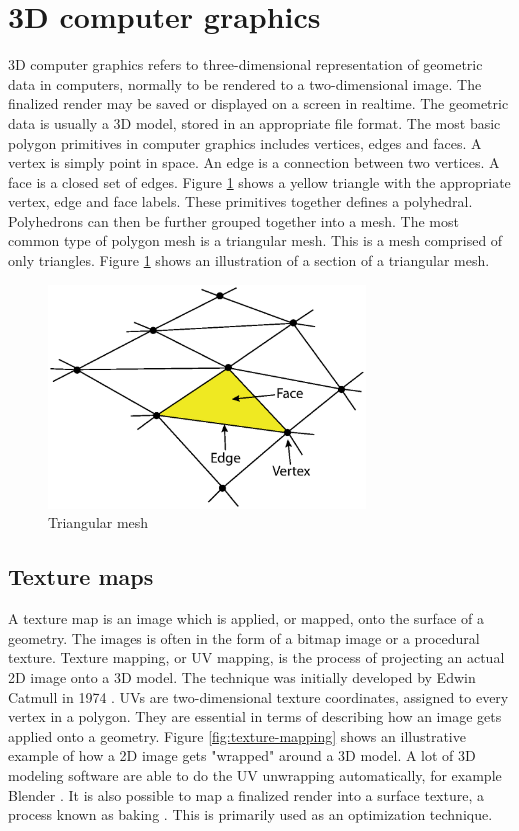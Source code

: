 \section{3D computer graphics}
3D computer graphics refers to three-dimensional representation of geometric data in computers, normally to be rendered to a two-dimensional image. The finalized render may be saved or displayed on a screen in realtime. The geometric data is usually a 3D model, stored in an appropriate file format. The most basic polygon primitives in computer graphics includes vertices, edges and faces. A vertex is simply point in space. An edge is a connection between two vertices. A face is a closed set of edges. Figure \ref{fig:triangular-mesh} shows a yellow triangle with the appropriate vertex, edge and face labels. These primitives together defines a polyhedral. Polyhedrons can then be further grouped together into a mesh. The most common type of polygon mesh is a triangular mesh. This is a mesh comprised of only triangles. Figure \ref{fig:triangular-mesh} shows an illustration of a section of a triangular mesh.
\begin{figure}[h]
    \centering
    \includegraphics[width=0.75\textwidth]{sections/theory/figures/mesh.eps}
    \caption{Triangular mesh}
    \label{fig:triangular-mesh}
\end{figure}

\subsection{Texture maps}
A texture map is an image which is applied, or mapped, onto the surface of a geometry. The images is often in the form of a bitmap image or a procedural texture. Texture mapping, or UV mapping, is the process of projecting an actual 2D image onto a 3D model. The technique was initially developed by Edwin Catmull in 1974 \cite{catmull-texture-mapping}. UVs are two-dimensional texture coordinates, assigned to every vertex in a polygon. They are essential in terms of describing how an image gets applied onto a geometry. Figure \ref{fig:texture-mapping} shows an illustrative example of how a 2D image gets "wrapped" around a 3D model. A lot of 3D modeling software are able to do the UV unwrapping automatically, for example Blender \cite{blender}. It is also possible to map a finalized render into a surface texture, a process known as baking \cite{blender-texture-baking}. This is primarily used as an optimization technique.

